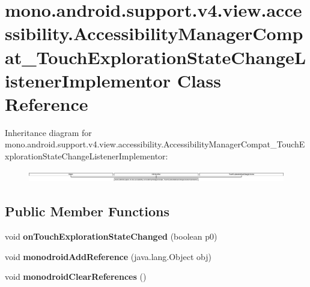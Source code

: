 \hypertarget{classmono_1_1android_1_1support_1_1v4_1_1view_1_1accessibility_1_1_accessibility_manager_compat_9bd6a396809ffec70e161c1567d2a373}{}\section{mono.\+android.\+support.\+v4.\+view.\+accessibility.\+Accessibility\+Manager\+Compat\+\_\+\+Touch\+Exploration\+State\+Change\+Listener\+Implementor Class Reference}
\label{classmono_1_1android_1_1support_1_1v4_1_1view_1_1accessibility_1_1_accessibility_manager_compat_9bd6a396809ffec70e161c1567d2a373}
Inheritance diagram for mono.\+android.\+support.\+v4.\+view.\+accessibility.\+Accessibility\+Manager\+Compat\+\_\+\+Touch\+Exploration\+State\+Change\+Listener\+Implementor\+:\begin{figure}[H]
\begin{center}
\leavevmode
\includegraphics[height=0.517799cm]{classmono_1_1android_1_1support_1_1v4_1_1view_1_1accessibility_1_1_accessibility_manager_compat_9bd6a396809ffec70e161c1567d2a373}
\end{center}
\end{figure}
\subsection*{Public Member Functions}
\begin{DoxyCompactItemize}
\item 
\mbox{\label{classmono_1_1android_1_1support_1_1v4_1_1view_1_1accessibility_1_1_accessibility_manager_compat_9bd6a396809ffec70e161c1567d2a373_abbf61e7546b08cf0d159de6aea819833}} 
void {\bfseries on\+Touch\+Exploration\+State\+Changed} (boolean p0)
\item 
\mbox{\label{classmono_1_1android_1_1support_1_1v4_1_1view_1_1accessibility_1_1_accessibility_manager_compat_9bd6a396809ffec70e161c1567d2a373_a646b0cb4c9332288a6d51479147d0466}} 
void {\bfseries monodroid\+Add\+Reference} (java.\+lang.\+Object obj)
\item 
\mbox{\label{classmono_1_1android_1_1support_1_1v4_1_1view_1_1accessibility_1_1_accessibility_manager_compat_9bd6a396809ffec70e161c1567d2a373_aa27a317e4acec5bb2ce6981d96dbaffe}} 
void {\bfseries monodroid\+Clear\+References} ()
\end{DoxyCompactItemize}
